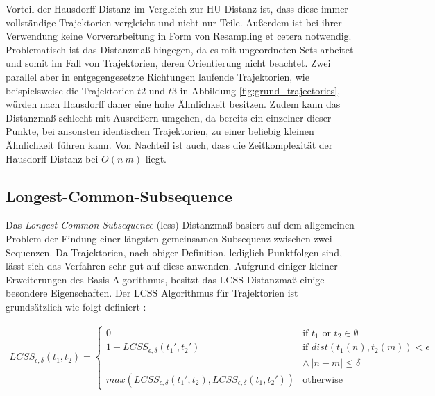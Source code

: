 Vorteil der Hausdorff Distanz im Vergleich zur HU Distanz ist, dass diese immer vollständige Trajektorien vergleicht
und nicht nur Teile. Außerdem ist bei ihrer Verwendung keine Vorverarbeitung in Form von Resampling et cetera notwendig.
Problematisch ist das Distanzmaß hingegen, da es mit ungeordneten Sets arbeitet und somit im Fall von Trajektorien, deren
Orientierung nicht beachtet. Zwei parallel aber in entgegengesetzte Richtungen laufende Trajektorien, wie beispielsweise
die Trajektorien $t2$ und $t3$ in Abbildung \ref{fig:grund_trajectories}, würden nach Hausdorff daher eine hohe Ähnlichkeit besitzen.
Zudem kann das Distanzmaß schlecht mit Ausreißern umgehen, da bereits ein einzelner dieser Punkte, bei ansonsten identischen
Trajektorien, zu einer beliebig kleinen Ähnlichkeit führen kann.
Von Nachteil ist auch, dass die Zeitkomplexität der Hausdorff-Distanz bei $O(n\ m)$ liegt.

\subsection{Longest-Common-Subsequence}
\label{sec:lcss_distance}

Das \textit{Longest-Common-Subsequence} (\acrshort*{lcss}) Distanzmaß basiert auf dem allgemeinen Problem der Findung
einer längsten gemeinsamen Subsequenz zwischen zwei Sequenzen. Da Trajektorien, nach obiger Definition, lediglich Punktfolgen sind,
lässt sich das Verfahren sehr gut auf diese anwenden. Aufgrund einiger kleiner Erweiterungen des Basis-Algorithmus, besitzt
das LCSS Distanzmaß einige besondere Eigenschaften. Der LCSS Algorithmus für Trajektorien ist grundsätzlich
wie folgt definiert \cite[]{Vlachos2002}:

\begin{ceqn}
\begin{align}
\label{eq_lcss}
    LCSS_{\epsilon, \delta}(t_1, t_2) =
    \begin{cases}
        0 & \text{if } t_1 \text{ or } t_2 \in \emptyset \\
        1 + LCSS_{\epsilon, \delta}(t_1', t_2') & \text{if } dist(t_1(n), t_2(m)) < \epsilon \\
        & \land\ |n - m| \leq \delta \\
        max(LCSS_{\epsilon, \delta}(t_1', t_2), LCSS_{\epsilon, \delta}(t_1, t_2')) & \text{otherwise}
    \end{cases}
\end{align}
\end{ceqn}

